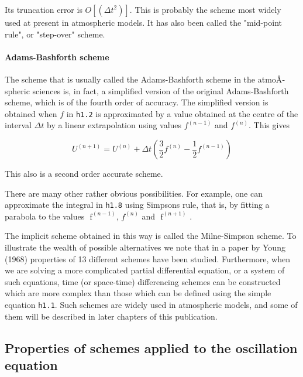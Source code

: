 Its truncation error is
\( O\left\lbrack \left( {\Delta t}^{2} \right) \right\rbrack\). This is
probably the scheme most widely used at present in atmospheric models.
It has also been called the "mid-point rule", or "step-over" scheme.

\paragraph{Adams-Bashforth scheme}\label{adams-bashforth-scheme}

The scheme that is usually called the Adams-Bashforth scheme in the
atmoÂ­spheric sciences is, in fact, a simplified version of the original
Adams-Bashforth scheme, which is of the fourth order of accuracy. The
simplified version is obtained when \(f\) in \texttt{h1.2} is
approximated by a value obtained at the centre of the interval
\(\Delta t\) by a linear extrapolation using values
\(f^{\left( n - 1 \right)}\) and \(f^{\left( n \right)}\). This gives

{\[U^{\left( n + 1 \right)} = U^{\left( n \right)} + \Delta t\left( \frac{3}{2}f^{\left( n \right)} - \frac{1}{2}f^{\left( n - 1 \right)} \right)\]}

This also is a second order accurate scheme.

There are many other rather obvious possibilities. For example, one can
approximate the integral in \texttt{h1.8} using
Simpson\textquotesingle s rule, that is, by fitting a parabola to the
values \(\text{ f}^{\left( n - 1 \right)}\), \(f^{\left( n \right)}\)
and \(\text{ f}^{\left( n + 1 \right)}\) .

The implicit scheme obtained in this way is called the Milne-Simpson
scheme. To illustrate the wealth of possible alternatives we note that
in a paper by Young (1968) properties of 13 different schemes have been
studied. Furthermore, when we are solving a more complicated partial
differential equation, or a system of such equations, time (or
space-time) differencing schemes can be constructed which are more
complex than those which can be defined using the simple equation
\texttt{h1.1}. Such schemes are widely used in atmospheric models, and
some of them will be described in later chapters of this publication.

\subsection{\texorpdfstring{\textbf{Properties of schemes applied to the
oscillation
equation}}{Properties of schemes applied to the oscillation equation}}\label{properties-of-schemes-applied-to-the-oscillation-equation}

